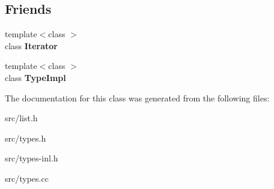 \subsection*{Friends}
\begin{DoxyCompactItemize}
\item 
\hypertarget{classv8_1_1internal_1_1_type_impl_ade6ce99c1c6680cd228fe1aa6927bdaf}{}{\footnotesize template$<$class $>$ }\\class {\bfseries Iterator}\label{classv8_1_1internal_1_1_type_impl_ade6ce99c1c6680cd228fe1aa6927bdaf}

\item 
\hypertarget{classv8_1_1internal_1_1_type_impl_a4329ebeb28d34f95516ba1e6939c015b}{}{\footnotesize template$<$class $>$ }\\class {\bfseries Type\+Impl}\label{classv8_1_1internal_1_1_type_impl_a4329ebeb28d34f95516ba1e6939c015b}

\end{DoxyCompactItemize}


The documentation for this class was generated from the following files\+:\begin{DoxyCompactItemize}
\item 
src/list.\+h\item 
src/types.\+h\item 
src/types-\/inl.\+h\item 
src/types.\+cc\end{DoxyCompactItemize}
